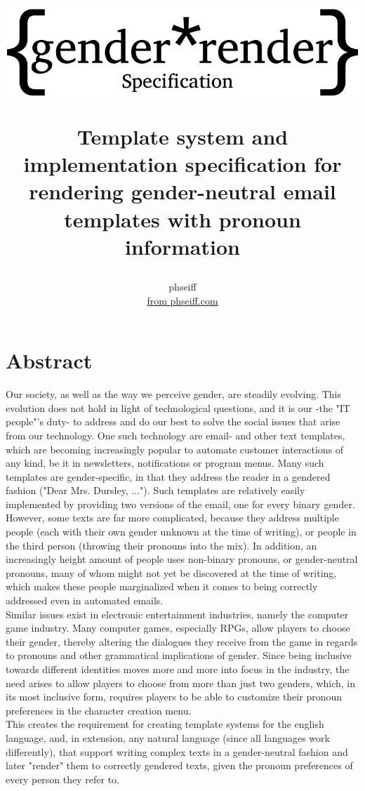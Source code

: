 \documentclass{article}
\author{phseiff\\ \href{https://phseiff.com}{from phseiff.com}\\ {\href{https://github.com/phseiff/gender-render/\#download-specifications--changelog}{\version}}}
\title{\begin{center}
           \includegraphics{images/title-black.pdf}
\end{center} Template system and implementation specification for rendering gender-neutral email templates with pronoun information}
\begin{document}
\maketitle
\pagebreak
\tableofcontents
\pagebreak

\section{Abstract}

    Our society, as well as the way we perceive gender, are steadily evolving.
    This evolution does not hold in light of technological questions, and it is our -the "IT people"'s duty- to address and do our best to solve the social issues that arise from our technology.
    One such technology are email- and other text templates, which are becoming increasingly popular to automate customer interactions of any kind, be it in newsletters, notifications or program menus.
    Many such templates are gender-specific, in that they address the reader in a gendered fashion ("Dear Mrs. Dursley, ...").
    Such templates are relatively easily implemented by providing two versions of the email, one for every binary gender.
    However, some texts are far more complicated, because they address multiple people (each with their own gender unknown at the time of writing), or people in the third person (throwing their pronouns into the mix).
    In addition, an increasingly height amount of people uses non-binary pronouns, or gender-neutral pronouns, many of whom might not yet be discovered at the time of writing, which makes these people marginalized when it comes to being correctly addressed even in automated emails.\\

    Similar issues exist in electronic entertainment industries, namely the computer game industry.
    Many computer games, especially RPGs, allow players to choose their gender, thereby altering the dialogues they receive from the game in regards to pronouns and other grammatical implications of gender.
    Since being inclusive towards different identities moves more and more into focus in the industry, the need arises to allow players to choose from more than just two genders, which, in its most inclusive form, requires players to be able to customize their pronoun preferences in the character creation menu.\\

    This creates the requirement for creating template systems for the english language, and, in extension, any natural language (since all languages work differently), that support writing complex texts in a gender-neutral fashion and later "render" them to correctly gendered texts, given the pronoun preferences of every person they refer to.\\
\end{document}

